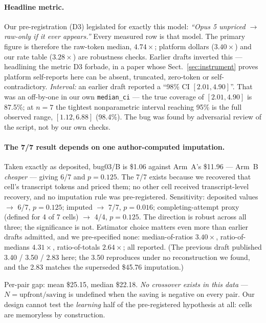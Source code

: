 \documentclass[runningheads]{llncs}
\begin{document}
\paragraph{Headline metric.} Our pre-registration (D3) legislated for exactly
this model: \emph{``Opus 5 unpriced $\rightarrow$ raw-only if it ever
appears.''} Every measured row is that model. The primary figure is therefore
the raw-token median, $4.74\times$; platform dollars ($3.40\times$) and our
rate table ($3.28\times$) are robustness checks. Earlier drafts inverted this
--- headlining the metric D3 forbade, in a paper whose
Sect.~\ref{sec:instrument} proves platform self-reports here can be absent,
truncated, zero-token or self-contradictory. \emph{Interval:} an earlier
draft reported a ``98\% CI $[2.01,4.90]$''. That was an off-by-one in our own
\texttt{median\_ci} --- the true coverage of $[2.01,4.90]$ is 87.5\%; at
$n=7$ the tightest nonparametric interval reaching 95\% is the full observed
range, $[1.12, 6.88]$ (98.4\%). The bug was found by adversarial review of
the script, not by our own checks.

\paragraph{The 7/7 result depends on one author-computed imputation.} Taken
exactly as deposited, bug03/B is \$1.06 against Arm~A's \$11.96 --- Arm~B
\emph{cheaper} --- giving 6/7 and $p=0.125$. The 7/7 exists because we
recovered that cell's transcript tokens and priced them; no other cell
received transcript-level recovery, and no imputation rule was
pre-registered. Sensitivity: deposited values $\rightarrow$ 6/7, $p=0.125$;
imputed $\rightarrow$ 7/7, $p=0.016$; completing-attempt proxy (defined for 4
of 7 cells) $\rightarrow$ 4/4, $p=0.125$. The direction is robust across all
three; the significance is not. Estimator choice matters even more than
earlier drafts admitted, and we pre-specified none: median-of-ratios
$3.40\times$, ratio-of-medians $4.31\times$, ratio-of-totals $2.64\times$;
all reported. (The previous draft published 3.40 / 3.50 / 2.83 here; the
3.50 reproduces under no reconstruction we found, and the 2.83 matches the
superseded \$45.76 imputation.)

Per-pair gap: mean \$25.15, median \$22.18. \emph{No crossover exists in this
data} --- $N=\mathrm{upfront}/\mathrm{saving}$ is undefined when the saving
is negative on every pair. Our design cannot test the \emph{learning} half of
the pre-registered hypothesis at all: cells are memoryless by construction.
\end{document}
